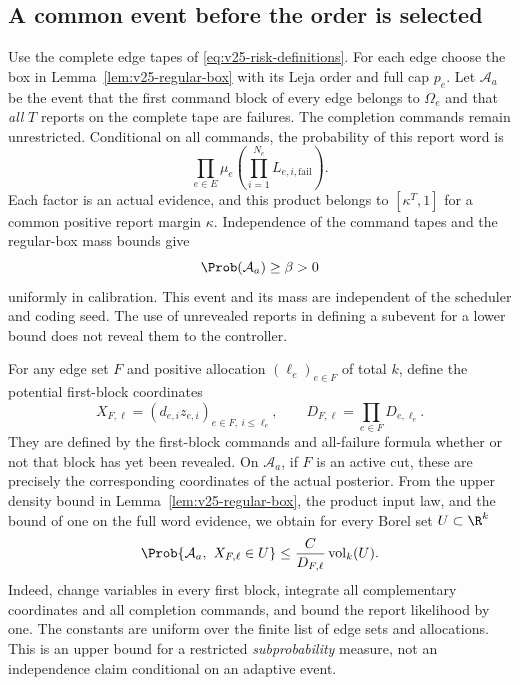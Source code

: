 \subsection{A common event before the order is selected}
Use the complete edge tapes of \eqref{eq:v25-risk-definitions}.
For each edge choose the box in Lemma~\ref{lem:v25-regular-box} with
its Leja order and full cap $p_e$. Let $\mathcal A_a$ be the event
that the first command block of every edge belongs to $\Omega_e$ and
that \emph{all} $T$ reports on the complete tape are failures. The
completion commands remain unrestricted. Conditional on all commands,
the probability of this report word is
\[
 \prod_{e\in E}\mu_e\left(\prod_{i=1}^{N_e}
                                  L_{e,i,\mathrm{fail}}\right).
\]
Each factor is an actual evidence, and this product belongs to
$[\kappa^T,1]$ for a common positive report margin $\kappa$.
Independence of the command tapes and the regular-box mass bounds give
\begin{equation}\label{eq:v25-common-mass}
 \Prob(\mathcal A_a)\ge\beta>0
\end{equation}
uniformly in calibration. This event and its mass are independent of
the scheduler and coding seed. The use of unrevealed reports in defining
a subevent for a lower bound does not reveal them to the controller.

For any edge set $F$ and positive allocation $(\ell_e)_{e\in F}$ of
total $k$, define the potential first-block coordinates
\[
 X_{F,\ell}=(d_{e,i}z_{e,i})_{e\in F,\ i\le\ell_e},\qquad
 D_{F,\ell}=\prod_{e\in F}D_{e,\ell_e}.
\]
They are defined by the first-block commands and all-failure formula
whether or not that block has yet been revealed. On $\mathcal A_a$,
if $F$ is an active cut, these are precisely the corresponding
coordinates of the actual posterior. From the upper density bound in
Lemma~\ref{lem:v25-regular-box}, the product input law, and the bound
of one on the full word evidence, we obtain for every Borel set
$U\subset\R^k$
\begin{equation}\label{eq:v25-restricted-density}
 \Prob\{\mathcal A_a,\ X_{F,\ell}\in U\}
                  \le \frac{C}{D_{F,\ell}}\operatorname{vol}_k(U).
\end{equation}
Indeed, change variables in every first block, integrate all complementary
coordinates and all completion commands, and bound the report likelihood
by one. The constants are uniform over the finite list of edge sets and
allocations. This is an upper bound for a restricted \emph{subprobability}
measure, not an independence claim conditional on an adaptive event.

